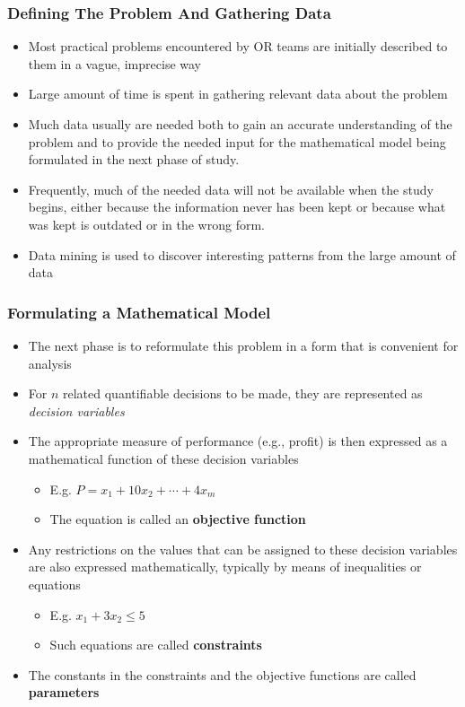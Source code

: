\documentclass[12pt]{article}
\begin{document}
\subsubsection*{Defining The Problem And Gathering Data}

\begin{itemize}
\item Most practical problems encountered by OR teams are initially described to them in a vague, imprecise way
\item Large amount of time is spent in gathering relevant data about the problem
\item Much data usually are needed both to gain an accurate understanding of
the problem and to provide the needed input for the mathematical model being formulated
in the next phase of study. 
\item Frequently, much of the needed data will not be available when
the study begins, either because the information never has been kept or because what was
kept is outdated or in the wrong form.
\item Data mining is used to discover interesting patterns from the large amount of data
\end{itemize}


\subsubsection*{Formulating a Mathematical Model}


\begin{itemize}
\item The next phase is to reformulate this problem in a form that is convenient for analysis
\item For $n$ related quantifiable decisions to be made, they are represented as \emph{decision variables}
\item The appropriate measure of performance (e.g., profit) is then expressed as a mathematical function of these decision variables
\begin{itemize}
\item E.g. $P=x_1+10 x_2 + \cdots + 4 x_m$
\item The equation is called an \textbf{objective function}
\end{itemize}
\item Any restrictions on the values that can be assigned to these decision variables are also expressed mathematically, typically by means of inequalities or equations
\begin{itemize}
\item E.g. $x_1 + 3 x_2 \le 5$
\item Such equations are called \textbf{constraints}
\end{itemize}
\item The constants in the constraints and the objective functions are called \textbf{parameters}
\end{itemize}
\end{document}
